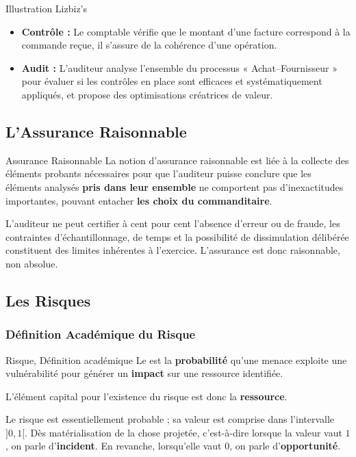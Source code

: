 \begin{boxlizbiz}{Illustration Lizbiz's}
\begin{itemize}
  \item \textbf{Contrôle :} Le comptable vérifie que le montant d'une facture
    correspond à la commande reçue, il s'assure de la cohérence d'une opération.
  \item \textbf{Audit :} L'auditeur analyse l'ensemble du processus
    « Achat–Fournisseur » pour évaluer si les contrôles en place sont efficaces et
    systématiquement appliqués, et propose des optimisations créatrices de valeur.
\end{itemize}
\end{boxlizbiz}

\subsection{L'Assurance Raisonnable}

\begin{boxdef}{Assurance Raisonnable}
La notion d'assurance raisonnable est liée à la collecte des éléments probants
nécessaires pour que l'auditeur puisse conclure que les éléments analysés
\textbf{pris dans leur ensemble} ne comportent pas d'inexactitudes importantes,
pouvant entacher \textbf{les choix du commanditaire}.
\end{boxdef}

L'auditeur ne peut certifier à cent pour cent l'absence d'erreur ou de fraude, les
contraintes d'échantillonnage, de temps et la possibilité de dissimulation délibérée
constituent des limites inhérentes à l'exercice. L'assurance est donc raisonnable,
non absolue.

\subsection{Les Risques}
\label{subsec:risques}

\subsubsection{Définition Académique du Risque}

\begin{boxdef}{Risque, Définition académique}
Le  est la \textbf{probabilité} qu'une menace exploite une
vulnérabilité pour générer un \textbf{impact} sur une ressource identifiée.

L'élément capital pour l'existence du risque est donc la \textbf{ressource}.

Le risque est essentiellement probable ; sa valeur est comprise dans l'intervalle
$]0,1[$. Dès matérialisation de la chose projetée, c'est-à-dire lorsque la valeur
vaut $1$, on parle d'\textbf{incident}. En revanche, lorsqu'elle vaut $0$, on parle
d'\textbf{opportunité}.
\end{boxdef}

